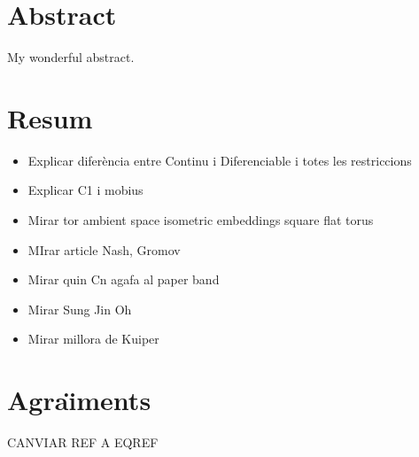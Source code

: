 \documentclass[11pt,a4paper,openright,oneside]{book}
\numberwithin{equation}{section}
\theoremstyle{definition}
\begin{document}
\newpage
{} 

\section*{Abstract}
My wonderful abstract.

\section*{Resum}
\begin{itemize}
    \item Explicar diferència entre Continu i Diferenciable i totes les restriccions
    \item Explicar C1 i mobius
    \item Mirar tor ambient space isometric embeddings square flat torus
    \item MIrar article Nash, Gromov
    \item Mirar quin Cn agafa al paper band
    \item Mirar Sung Jin Oh
    \item Mirar millora de Kuiper
\end{itemize}

\newpage 


\section*{Agra\"{\i}ments}

{\color{red} CANVIAR REF A EQREF}
\newpage

\tableofcontents

\newpage








%



\normalfont
\end{document}
